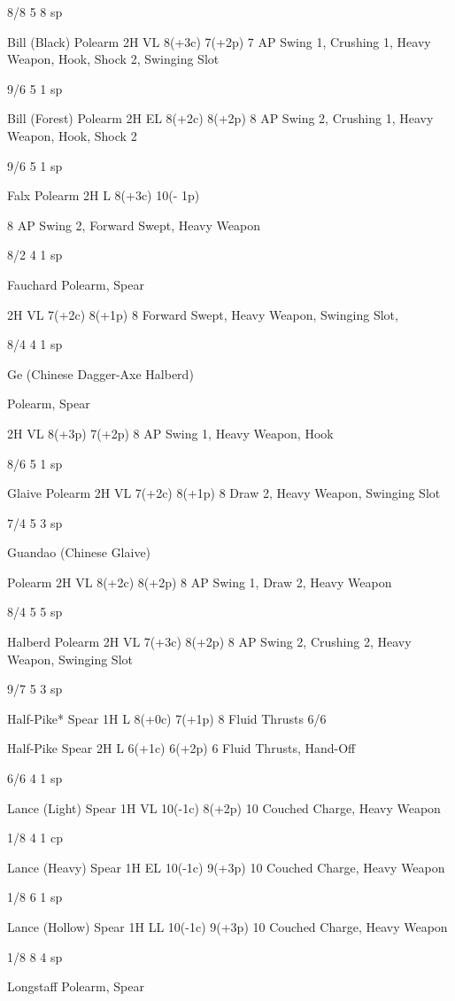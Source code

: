 \documentclass[oneside,11pt,english]{book}
\begin{document}
8/8 5 8 sp 

Bill (Black) Polearm 2H VL 8(+3c) 7(+2p) 7 AP Swing 1, 
Crushing 1, Heavy 
Weapon, Hook, 
Shock 2, Swinging 
Slot 

9/6 5 1 sp 

Bill (Forest) Polearm 2H EL 8(+2c) 8(+2p) 8 AP Swing 2, 
Crushing 1, Heavy 
Weapon, Hook, 
Shock 2 

9/6 5 1 sp 

Falx Polearm 2H L 8(+3c) 10(-
1p) 

8 AP Swing 2, 
Forward Swept, 
Heavy Weapon 

8/2 4 1 sp 

Fauchard Polearm, 
Spear 

2H VL 7(+2c) 8(+1p) 8 Forward Swept, 
Heavy Weapon, 
Swinging Slot, 

8/4 4 1 sp 

Ge (Chinese 
Dagger-Axe 
Halberd) 

Polearm, 
Spear 

2H VL 8(+3p) 7(+2p) 8 AP Swing 1, 
Heavy Weapon, 
Hook 

8/6 5 1 sp 

Glaive Polearm 2H VL 7(+2c) 8(+1p) 8 Draw 2, Heavy 
Weapon, Swinging 
Slot 

7/4 5 3 sp 

Guandao (Chinese 
Glaive) 

Polearm 2H VL 8(+2c) 8(+2p) 8 AP Swing 1, Draw 
2, Heavy Weapon 

8/4 5 5 sp 

Halberd Polearm 2H VL 7(+3c) 8(+2p) 8 AP Swing 2, 
Crushing 2, Heavy 
Weapon, Swinging 
Slot 

9/7 5 3 sp 

Half-Pike* Spear 1H L 8(+0c) 7(+1p) 8 Fluid Thrusts 6/6 


Half-Pike Spear 2H L 6(+1c) 6(+2p) 6 Fluid Thrusts, 
Hand-Off 

6/6 4 1 sp 

Lance (Light) Spear 1H VL 10(-1c) 8(+2p) 10 Couched Charge, 
Heavy Weapon 

1/8 4 1 cp 

Lance (Heavy) Spear 1H EL 10(-1c) 9(+3p) 10 Couched Charge, 
Heavy Weapon 

1/8 6 1 sp 

Lance (Hollow) Spear 1H LL 10(-1c) 9(+3p) 10 Couched Charge, 
Heavy Weapon 

1/8 8 4 sp 

Longstaff Polearm, 
Spear 
\end{document}
